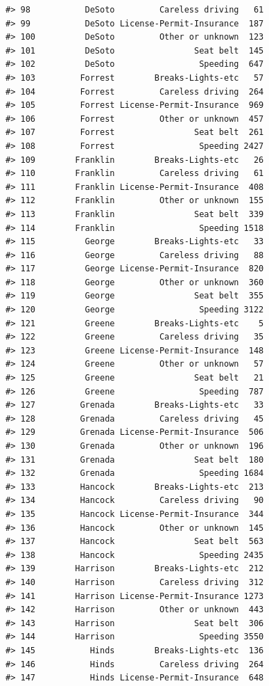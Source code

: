 \documentclass[
]{book}
\begin{document}
\begin{verbatim}
#> 98           DeSoto         Careless driving   61
#> 99           DeSoto License-Permit-Insurance  187
#> 100          DeSoto         Other or unknown  123
#> 101          DeSoto                Seat belt  145
#> 102          DeSoto                 Speeding  647
#> 103         Forrest        Breaks-Lights-etc   57
#> 104         Forrest         Careless driving  264
#> 105         Forrest License-Permit-Insurance  969
#> 106         Forrest         Other or unknown  457
#> 107         Forrest                Seat belt  261
#> 108         Forrest                 Speeding 2427
#> 109        Franklin        Breaks-Lights-etc   26
#> 110        Franklin         Careless driving   61
#> 111        Franklin License-Permit-Insurance  408
#> 112        Franklin         Other or unknown  155
#> 113        Franklin                Seat belt  339
#> 114        Franklin                 Speeding 1518
#> 115          George        Breaks-Lights-etc   33
#> 116          George         Careless driving   88
#> 117          George License-Permit-Insurance  820
#> 118          George         Other or unknown  360
#> 119          George                Seat belt  355
#> 120          George                 Speeding 3122
#> 121          Greene        Breaks-Lights-etc    5
#> 122          Greene         Careless driving   35
#> 123          Greene License-Permit-Insurance  148
#> 124          Greene         Other or unknown   57
#> 125          Greene                Seat belt   21
#> 126          Greene                 Speeding  787
#> 127         Grenada        Breaks-Lights-etc   33
#> 128         Grenada         Careless driving   45
#> 129         Grenada License-Permit-Insurance  506
#> 130         Grenada         Other or unknown  196
#> 131         Grenada                Seat belt  180
#> 132         Grenada                 Speeding 1684
#> 133         Hancock        Breaks-Lights-etc  213
#> 134         Hancock         Careless driving   90
#> 135         Hancock License-Permit-Insurance  344
#> 136         Hancock         Other or unknown  145
#> 137         Hancock                Seat belt  563
#> 138         Hancock                 Speeding 2435
#> 139        Harrison        Breaks-Lights-etc  212
#> 140        Harrison         Careless driving  312
#> 141        Harrison License-Permit-Insurance 1273
#> 142        Harrison         Other or unknown  443
#> 143        Harrison                Seat belt  306
#> 144        Harrison                 Speeding 3550
#> 145           Hinds        Breaks-Lights-etc  136
#> 146           Hinds         Careless driving  264
#> 147           Hinds License-Permit-Insurance  648

\end{verbatim}
\end{document}
